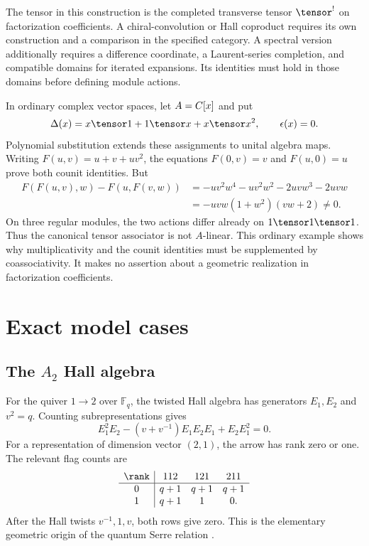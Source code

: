 The tensor in this construction is the completed transverse tensor
$\tensor^!$ on factorization coefficients.
A chiral-convolution or Hall coproduct requires its own construction
and a comparison in the specified category.
A spectral version additionally requires a difference coordinate,
a Laurent-series completion, and compatible domains for iterated expansions.
Its identities must hold in those domains before defining module actions.

\begin{example}
In ordinary complex vector spaces, let $A=C[x]$ and put
\[
 \Delta(x)=x\tensor1+1\tensor x+x\tensor x^2,
 \qquad \epsilon(x)=0.
\]
Polynomial substitution extends these assignments to unital algebra maps.
Writing $F(u,v)=u+v+uv^2$, the equations
$F(0,v)=v$ and $F(u,0)=u$ prove both counit identities.
But
\[
\begin{split}
 F(F(u,v),w)-F(u,F(v,w))
 &=-uv^2w^4-uv^2w^2-2uvw^3-2uvw\\
 &=-uvw(1+w^2)(vw+2)\ne0.
\end{split}
\]
On three regular modules, the two actions differ already on
$1\tensor1\tensor1$.
Thus the canonical tensor associator is not $A$-linear.
This ordinary example shows why multiplicativity and the counit identities
must be supplemented by coassociativity.
It makes no assertion about a geometric realization in factorization coefficients.
\end{example}

\part{Exact model cases}

\chapter{The \texorpdfstring{$A_2$}{A2} Hall algebra}
For the quiver $1\to2$ over $\mathbb F_q$, the twisted Hall algebra has generators $E_1,E_2$ and $v^2=q$. Counting subrepresentations gives
\[
 E_1^2E_2-(v+v^{-1})E_1E_2E_1+E_2E_1^2=0.
\]
For a representation of dimension vector $(2,1)$, the arrow has rank zero or one. The relevant flag counts are
\[
\begin{array}{c|ccc}
\rank&112&121&211\\ \hline
0&q+1&q+1&q+1\\
1&q+1&1&0.
\end{array}
\]
After the Hall twists $v^{-1},1,v$, both rows give zero. This is the elementary geometric origin of the quantum Serre relation \cite{Ringel,Green}.

